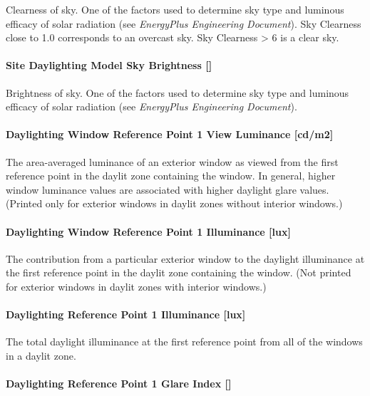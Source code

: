 Clearness of sky. One of the factors used to determine sky type and luminous efficacy of solar radiation (see \emph{EnergyPlus Engineering Document}). Sky Clearness close to 1.0 corresponds to an overcast sky. Sky Clearness \textgreater{} 6 is a clear sky.

\paragraph{\texorpdfstring{Site Daylighting Model Sky Brightness {[]}}{Site Daylighting Model Sky Brightness }}\label{site-daylighting-model-sky-brightness}

Brightness of sky. One of the factors used to determine sky type and luminous efficacy of solar radiation (see \emph{EnergyPlus Engineering Document}).

\paragraph{Daylighting Window Reference Point 1 View Luminance {[}cd/m2{]}}\label{daylighting-window-reference-point-1-view-luminance-cdm2}

The area-averaged luminance of an exterior window as viewed from the first reference point in the daylit zone containing the window. In general, higher window luminance values are associated with higher daylight glare values. (Printed only for exterior windows in daylit zones without interior windows.)

\paragraph{Daylighting Window Reference Point 1 Illuminance {[}lux{]}}\label{daylighting-window-reference-point-1-illuminance-lux}

The contribution from a particular exterior window to the daylight illuminance at the first reference point in the daylit zone containing the window. (Not printed for exterior windows in daylit zones with interior windows.)

\paragraph{Daylighting Reference Point 1 Illuminance {[}lux{]}}\label{daylighting-reference-point-1-illuminance-lux}

The total daylight illuminance at the first reference point from all of the windows in a daylit zone.

\paragraph{\texorpdfstring{Daylighting Reference Point 1 Glare Index {[]}}{Daylighting Reference Point 1 Glare Index }}\label{daylighting-reference-point-1-glare-index}

